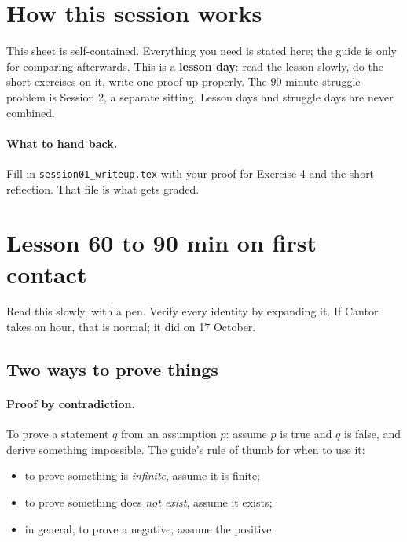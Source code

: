 \documentclass[11pt]{article}
\theoremstyle{plain}
\theoremstyle{definition}
\begin{document}

\section*{How this session works}

This sheet is self-contained. Everything you need is stated here; the guide is only for comparing afterwards. This is a \textbf{lesson day}: read the lesson slowly, do the short exercises on it, write one proof up properly. The 90-minute struggle problem is Session 2, a separate sitting. Lesson days and struggle days are never combined.


\paragraph{What to hand back.} Fill in \texttt{session01\_writeup.tex} with your proof for Exercise 4 and the short reflection. That file is what gets graded.

\section{Lesson \hfill 60 to 90 min on first contact}

Read this slowly, with a pen. Verify every identity by expanding it. If Cantor takes an hour, that is normal; it did on 17 October.

\subsection{Two ways to prove things}

\paragraph{Proof by contradiction.} To prove a statement $q$ from an assumption $p$: assume $p$ is true and $q$ is false, and derive something impossible. The guide's rule of thumb for when to use it:
\begin{itemize}
  \item to prove something is \emph{infinite}, assume it is finite;
  \item to prove something does \emph{not exist}, assume it exists;
  \item in general, to prove a negative, assume the positive.
\end{itemize}
\end{document}
